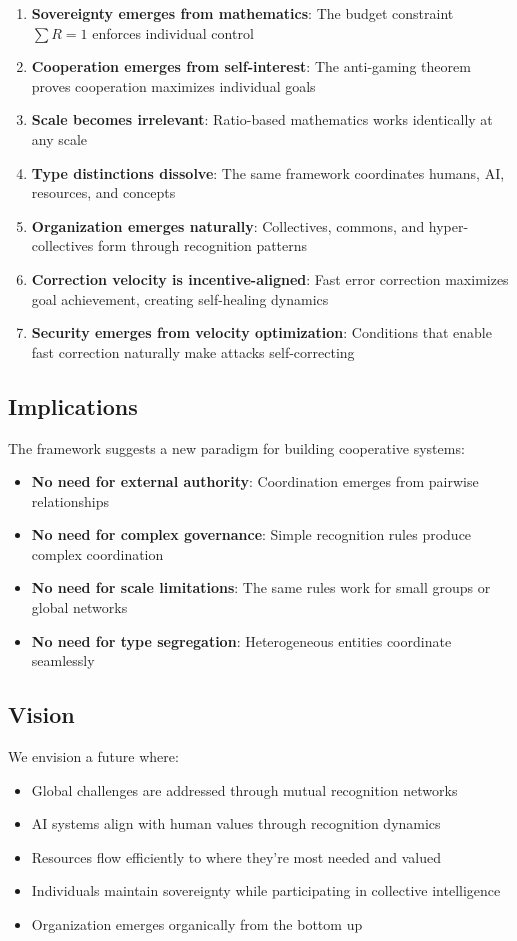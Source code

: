 \documentclass[11pt,a4paper]{article}
\theoremstyle{definition}
\theoremstyle{remark}
\begin{document}
\begin{enumerate}
\item \textbf{Sovereignty emerges from mathematics}: The budget constraint $\sum R=1$ enforces individual control
\item \textbf{Cooperation emerges from self-interest}: The anti-gaming theorem proves cooperation maximizes individual goals
\item \textbf{Scale becomes irrelevant}: Ratio-based mathematics works identically at any scale
\item \textbf{Type distinctions dissolve}: The same framework coordinates humans, AI, resources, and concepts
\item \textbf{Organization emerges naturally}: Collectives, commons, and hyper-collectives form through recognition patterns
\item \textbf{Correction velocity is incentive-aligned}: Fast error correction maximizes goal achievement, creating self-healing dynamics
\item \textbf{Security emerges from velocity optimization}: Conditions that enable fast correction naturally make attacks self-correcting
\end{enumerate}

\subsection{Implications}

The framework suggests a new paradigm for building cooperative systems:
\begin{itemize}
\item \textbf{No need for external authority}: Coordination emerges from pairwise relationships
\item \textbf{No need for complex governance}: Simple recognition rules produce complex coordination
\item \textbf{No need for scale limitations}: The same rules work for small groups or global networks
\item \textbf{No need for type segregation}: Heterogeneous entities coordinate seamlessly
\end{itemize}

\subsection{Vision}

We envision a future where:
\begin{itemize}
\item Global challenges are addressed through mutual recognition networks
\item AI systems align with human values through recognition dynamics
\item Resources flow efficiently to where they're most needed and valued
\item Individuals maintain sovereignty while participating in collective intelligence
\item Organization emerges organically from the bottom up
\end{itemize}
\end{document}
